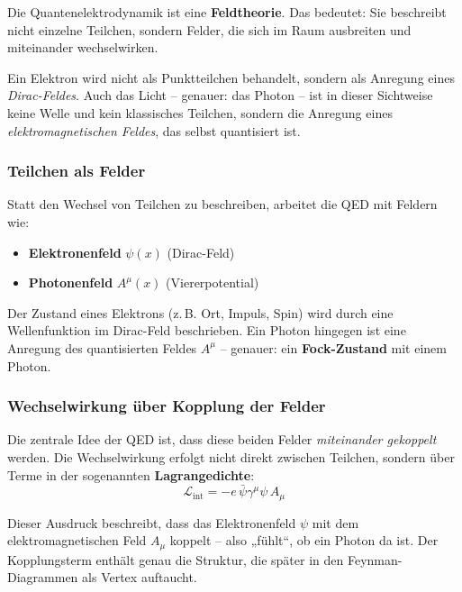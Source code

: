 Die Quantenelektrodynamik ist eine \textbf{Feldtheorie}. Das bedeutet: Sie beschreibt nicht einzelne Teilchen, sondern Felder, die sich im Raum ausbreiten und miteinander wechselwirken.

Ein Elektron wird nicht als Punktteilchen behandelt, sondern als Anregung eines \emph{Dirac-Feldes}. Auch das Licht – genauer: das Photon – ist in dieser Sichtweise keine Welle und kein klassisches Teilchen, sondern die Anregung eines \emph{elektromagnetischen Feldes}, das selbst quantisiert ist.

\subsubsection*{Teilchen als Felder}
Statt den Wechsel von Teilchen zu beschreiben, arbeitet die QED mit Feldern wie:
\begin{itemize}
	\item \textbf{Elektronenfeld} $\psi(x)$ (Dirac-Feld)
	\item \textbf{Photonenfeld} $A^\mu(x)$ (Viererpotential)
\end{itemize}

Der Zustand eines Elektrons (z.\,B. Ort, Impuls, Spin) wird durch eine Wellenfunktion im Dirac-Feld beschrieben. Ein Photon hingegen ist eine Anregung des quantisierten Feldes $A^\mu$ – genauer: ein \textbf{Fock-Zustand} mit einem Photon.

\subsubsection*{Wechselwirkung über Kopplung der Felder}
Die zentrale Idee der QED ist, dass diese beiden Felder \emph{miteinander gekoppelt} werden. Die Wechselwirkung erfolgt nicht direkt zwischen Teilchen, sondern über Terme in der sogenannten \textbf{Lagrangedichte}:
\[
\mathcal{L}_{\text{int}} = -e \, \bar{\psi} \gamma^\mu \psi \, A_\mu
\]

Dieser Ausdruck beschreibt, dass das Elektronenfeld $\psi$ mit dem elektromagnetischen Feld $A_\mu$ koppelt – also „fühlt“, ob ein Photon da ist. Der Kopplungsterm enthält genau die Struktur, die später in den Feynman-Diagrammen als Vertex auftaucht.

